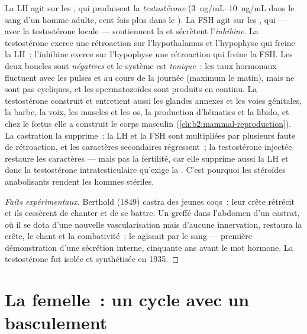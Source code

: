 \begin{proposition}\label{prop:b2:reproductive-hormones:testis}
La LH agit sur les , qui produisent la
\emph{testostérone} (\qtyrange{3}{10}{ng/mL} dans le sang d'un homme
adulte, cent fois plus dans le ). La FSH agit sur les , qui --- avec la testostérone locale --- soutiennent la
 et sécrètent l'\emph{inhibine}. La testostérone exerce
une rétroaction sur l'hypothalamus et l'hypophyse qui freine la LH~;
l'inhibine exerce sur l'hypophyse une rétroaction qui freine la FSH.
Les deux boucles sont \emph{négatives} et le système est
\emph{tonique}~: les taux hormonaux fluctuent avec les pulses et au
cours de la journée (maximum le matin), mais ne sont pas cycliques, et
les spermatozoïdes sont produits en continu. La testostérone construit
et entretient aussi les glandes annexes et les voies génitales, la
barbe, la voix, les muscles et les os, la production d'hématies et la
libido, et chez le fœtus elle a construit le corps masculin
(\cref{ch:b2:mammal-reproduction}). La castration la supprime~: la LH et
la FSH sont multipliées par plusieurs faute de rétroaction, et les
caractères secondaires régressent~; la testostérone injectée restaure
les caractères --- mais pas la fertilité, car elle supprime aussi la LH
et donc la testostérone intratesticulaire qu'exige la .
C'est pourquoi les stéroïdes anabolisants rendent les hommes stériles.
\end{proposition}
\begin{proof}[Faits expérimentaux]
Berthold (1849) castra des jeunes coqs~: leur crête rétrécit et ils
cessèrent de chanter et de se battre. Un  greffé dans
l'abdomen d'un castrat, où il se dota d'une nouvelle vascularisation
mais d'aucune innervation, restaura la crête, le chant et la
combativité~: le  agissait par le sang --- première
démonstration d'une sécrétion interne, cinquante ans avant le mot
hormone. La testostérone fut isolée et synthétisée en 1935.
\end{proof}

\section{La femelle~: un cycle avec un basculement}

